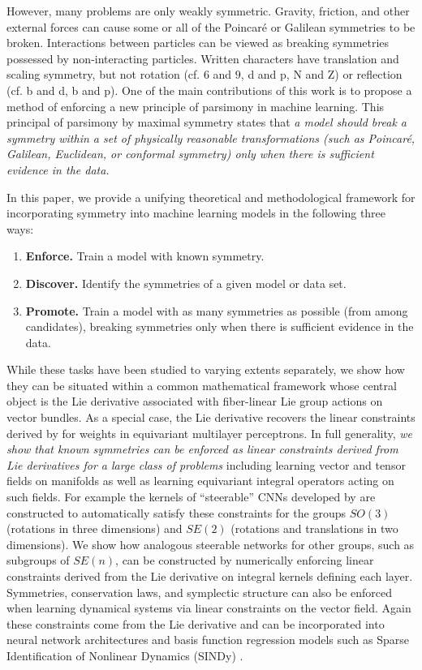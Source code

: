\documentclass[twoside,11pt]{article}
\begin{document}
However, many problems are only weakly symmetric.
Gravity, friction, and other external forces can cause some or all of the Poincar\'{e} or Galilean symmetries to be broken.
Interactions between particles can be viewed as breaking symmetries possessed by non-interacting particles.
Written characters have translation and scaling symmetry, but not rotation (cf. $6$ and $9$, d and p, N and Z) or reflection (cf. b and d, b and p).
One of the main contributions of this work is to propose a method of enforcing a new principle of parsimony in machine learning.
This principal of parsimony by maximal symmetry states that \emph{a model should break a symmetry within a set of physically reasonable transformations 
(such as Poincar\'{e}, Galilean, Euclidean, or conformal symmetry) 
only when there is sufficient evidence in the data.}

In this paper, we provide a unifying theoretical and methodological framework for incorporating symmetry into machine learning models in the following three ways:
\vspace{-.05in}
\begin{enumerate}[label=Task \arabic*., leftmargin=1.5cm,itemsep=-1.75pt]
    \item \textbf{Enforce.} Train a model with known symmetry.
    \item \textbf{Discover.} Identify the symmetries of a given model or data set.
    \item \textbf{Promote.} Train a model with as many symmetries as possible (from among candidates), breaking symmetries only when there is sufficient evidence in the data.
\end{enumerate}

While these tasks have been studied to varying extents separately,
we show how they can be situated within a common mathematical framework whose central object is
the Lie derivative associated with fiber-linear Lie group actions on vector bundles.
As a special case, the Lie derivative recovers the linear constraints derived by \citet{Finzi2021practical} for weights in equivariant multilayer perceptrons.
In full generality, \emph{we show that known symmetries can be enforced as linear constraints derived from Lie derivatives for a large class of problems} including learning vector and tensor fields on manifolds as well as learning equivariant integral operators acting on such fields.
For example the kernels of ``steerable'' CNNs developed by \cite{weiler20183d, Weiler2019general} are constructed to automatically satisfy these constraints for the groups $SO(3)$ (rotations in three dimensions) and $SE(2)$ (rotations and translations in two dimensions).
We show how analogous steerable networks for other groups, such as subgroups of $SE(n)$, can be constructed by numerically enforcing linear constraints derived from the Lie derivative on integral kernels defining each layer. 
Symmetries, conservation laws, and symplectic structure can also be enforced when learning dynamical systems via linear constraints on the vector field.
Again these constraints come from the Lie derivative and can be incorporated into neural network architectures and basis function regression models such as Sparse Identification of Nonlinear Dynamics (SINDy) \citep{Brunton2016discovering}.
\end{document}
